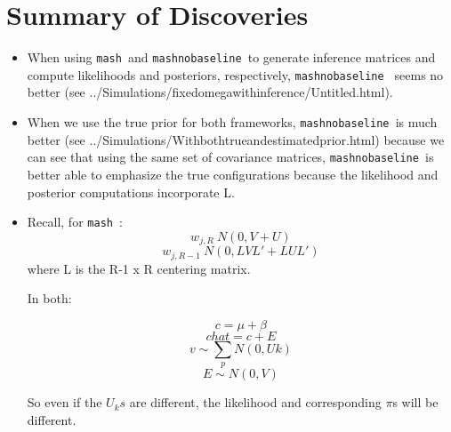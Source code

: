 \documentclass[11pt, oneside]{article}   	%
\def\mash{{\tt mash }}
\def\mnb{{\tt mashnobaseline }}
\begin{document}
{%

\section{Summary of Discoveries}

\begin{itemize}

\item When using \mash and \mnb to generate inference matrices and compute likelihoods and posteriors, respectively, \mnb 
seems no better (see ../Simulations/fixedomegawithinference/Untitled.html).

\item  When we use the true prior for both frameworks, \mnb is much better 
(see ../Simulations/Withbothtrueandestimatedprior.html) because we can see that using the same set of covariance matrices, \mnb is better able to emphasize the true configurations because the likelihood and posterior computations incorporate L.

\item Recall, for \mash{}:
$$w_{j,R} ~ N(0,V+U)$$
$$w_{j,R-1} ~ N(0,LVL' + LUL')$$ where L is the R-1 x R centering matrix.

In both:

$$c = \mu + \beta$$
$$chat = c + E$$
$$v \sim \sum_p N(0,Uk)$$
$$E \sim N(0,V)$$

So even if the $U_ks$ are different, the likelihood and corresponding $\pi$s will be different.




\end{itemize}}
\end{document}
